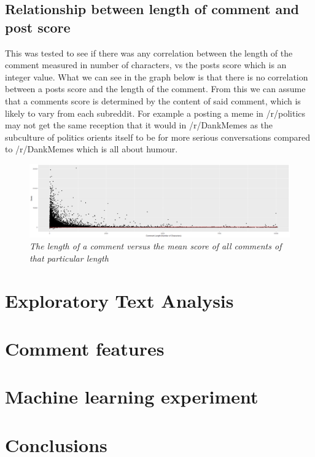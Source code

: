\subsection{Relationship between length of comment and post score}
	This was tested to see if there was any correlation between the length of the comment measured in number of characters, vs the posts score which is an integer value. What we can see in the graph below is that there is no correlation between a posts score and the length of the comment. From this we can assume that a comments score is determined by the content of said comment, which is likely to vary from each subreddit. For example a posting a meme in /r/politics may not get the same reception that it would in /r/DankMemes as the subculture of politics orients itself to be for more serious conversations compared to /r/DankMemes which is all about humour.
	\begin{figure}[ht]
		\centering
			\includegraphics[width=1.0\textwidth]{graphs/length_score_all_subs}
		\caption{\textit{The length of a comment versus the mean score of all comments of that particular length}}
	\end{figure}




\section {Exploratory Text Analysis}


\section {Comment features}

\section {Machine learning experiment}



\section{Conclusions}




